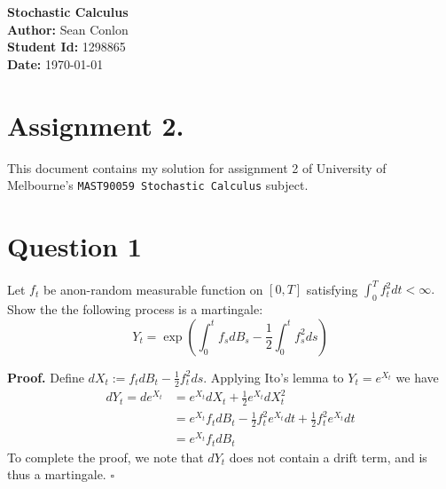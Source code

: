 \documentclass{article}
\begin{document}
\begin{titlepage}
    \centering
    {\Huge \textbf{Stochastic Calculus}}\\[1.5cm] %
    \textbf{Author:} Sean Conlon\\[1cm] %
    \textbf{Student Id:} 1298865\\[1cm]
    \textbf{Date:} \today\\[3cm] %
    
    \section*{Assignment 2.}
    This document contains my solution for assignment 2 of University of Melbourne's \texttt{MAST90059 Stochastic Calculus} subject.

    \tableofcontents
    
\end{titlepage}

\newpage
\section{Question 1}

\begin{tcolorbox}
[colframe=black,colback=gray!5,boxrule=0.5pt]
Let $f_t$ be  anon-random measurable function on $[0,T]$ satisfying $\int_0^Tf_t^2dt<\infty.$ Show the the following process is a martingale: 
$$Y_t = \exp\left(\int_0^t f_sdB_s - \frac{1}{2}\int_0^t f_s^2ds\right)$$
\end{tcolorbox}
\textbf{Proof.} Define $dX_t := f_tdB_t - \frac{1}{2}f_t^2ds$. Applying Ito's lemma to $Y_t = e^{X_t}$ we have
\begin{align*}
    dY_t = de^{X_t} &= e^{X_t}dX_t + \frac{1}{2}e^{X_t}dX_t^2 \\
    &= e^{X_t} f_tdB_t - \frac{1}{2}f_t^2e^{X_t}dt + \frac{1}{2}f_t^2e^{X_t}dt \\
    &= e^{X_t}f_t dB_t
\end{align*}
To complete the proof, we note that $dY_t$ does not contain a drift term, and is thus a martingale. $\square$
\end{document}

